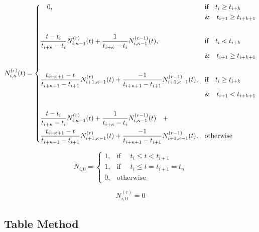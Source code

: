 \documentclass{article}
\begin{document}
 \begin{equation} \label{eq:Basis function rth derivative equation clamped}
  N^{(r)}_{i,\kappa}(t) = \begin{dcases} \quad 0, & \text{if} \quad t_{i} \geq t_{i+k} \\ & \text{\&} \quad t_{i+1} \geq t_{i+k+1} \\\\
  \frac{t - t_i}{t_{i+\kappa} - t_i} N^{(r)}_{i,\kappa-1}(t) + \frac{1}{t_{i+\kappa} - t_i} N^{(r-1)}_{i,\kappa-1}(t), & \text{if} \quad t_{i} < t_{i+k} \\ & \text{\&} \quad t_{i+1} \geq t_{i+k+1} \\\\
  \frac{t_{i+\kappa+1} - t}{t_{i+\kappa+1}-t_{i+1}} N^{(r)}_{i+1 , \kappa-1}(t) +  \frac{-1}{t_{i+\kappa+1}-t_{i+1}} N^{(r-1)}_{i+1 , \kappa-1}(t), & \text{if} \quad t_{i} \geq t_{i+k} \\ & \text{\&} \quad t_{i+1} < t_{i+k+1} \\\\
  \frac{t - t_i}{t_{i+\kappa} - t_i} N^{(r)}_{i,\kappa-1}(t) + \frac{1}{t_{i+\kappa} - t_i} N^{(r-1)}_{i,\kappa-1}(t) \quad + \\
  \frac{t_{i+\kappa+1} - t}{t_{i+\kappa+1}-t_{i+1}} N^{(r)}_{i+1 , \kappa-1}(t) +  \frac{-1}{t_{i+\kappa+1}-t_{i+1}} N^{(r-1)}_{i+1 , \kappa-1}(t), & \text{otherwise}
  \end{dcases}
  \end{equation}
  
 \hspace{1cm}
 
 \begin{equation} \label{eq:Basis function equation zeros}
      N_{i,0} =   \begin{cases} 1, &  \text{if } \quad t_i \leq t < t_{i+1} \\
                            1, & \text{if } \quad t_i \leq t = t_{i+1} = t_n \\
                            0, & \text{otherwise} \end{cases}
  \end{equation}
  
  \begin{equation}
      N_{i,0}^{(r)} = 0
  \end{equation}
  
\subsection{Table Method}
\end{document}
